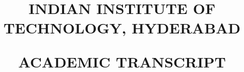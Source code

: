\documentclass[12pt]{article}
\begin{document}
\title{INDIAN INSTITUTE OF TECHNOLOGY, HYDERABAD\\ \begin{large}
ACADEMIC TRANSCRIPT
\end{large} }
\date{}
\maketitle
\end{document}
